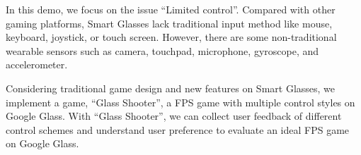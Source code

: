 \documentclass{acm_proc_article-sp}
\begin{document}
In this demo, we focus on the issue ``Limited control''. Compared with other gaming platforms, Smart Glasses lack traditional input method like mouse, keyboard, joystick, or touch screen. However, there are some non-traditional wearable sensors such as camera, touchpad, microphone, gyroscope, and accelerometer.





Considering traditional game design and new features on Smart Glasses, we implement a game, ``Glass Shooter'', a FPS game with multiple control styles on Google Glass. With ``Glass Shooter'', we can collect user feedback of different control schemes and understand user preference to evaluate an ideal FPS game on Google Glass. 
\end{document}
